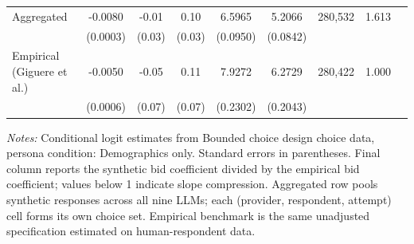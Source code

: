 \begin{table}[h]
{\begin{threeparttable}
\begin{tabular}{lcccccccr}
\midrule
Aggregated &   -0.0080 &     -0.01 &      0.10 &    6.5965 &    5.2066 &   280,532 &  1.613 \\
 & (0.0003) & (0.03) & (0.03) & (0.0950) & (0.0842) & & \\
\midrule
Empirical (Giguere et al.) &   -0.0050 &     -0.05 &      0.11 &    7.9272 &    6.2729 &   280,422 & 1.000 \\
 & (0.0006) & (0.07) & (0.07) & (0.2302) & (0.2043) & & \\
\bottomrule
\end{tabular}
\begin{tablenotes}\footnotesize
\item \textit{Notes:} Conditional logit estimates from Bounded choice design choice data, persona condition: Demographics only. 
Standard errors in parentheses. 
Final column reports the synthetic bid coefficient divided by the empirical bid coefficient; values below 1 indicate slope compression. 
Aggregated row pools synthetic responses across all nine LLMs; each (provider, respondent, attempt) cell forms its own choice set. 
Empirical benchmark is the same unadjusted specification estimated on \textcite{Giguere2020} human-respondent data.
\end{tablenotes}
\end{threeparttable}
}
\end{table}
